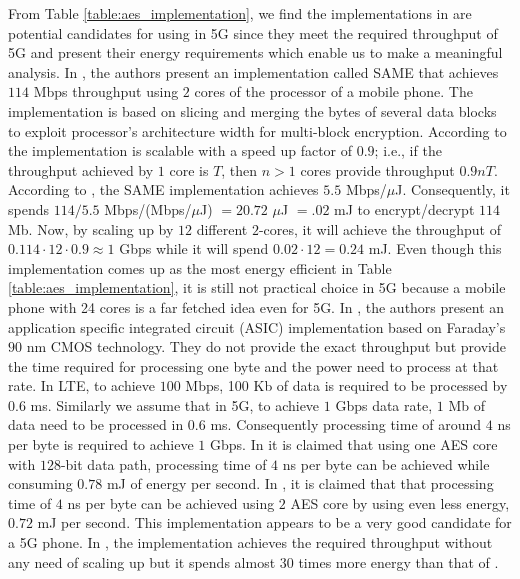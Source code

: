 \documentclass[lnicst,sechang,a4paper]{svmultln}
\begin{document}
From Table \ref{table:aes_implementation}, we find the implementations in \cite{Ruhr_2009, Ruhr_2011, Pune_2012} are potential candidates for using in 5G since they meet the required throughput of 5G and present their energy requirements which enable us to make a meaningful analysis. In \cite{Ruhr_2011}, the authors present an implementation called SAME that achieves $114$ Mbps throughput using $2$ cores of the processor of a mobile phone. The implementation is based on slicing and merging the bytes of several data blocks to exploit processor's architecture width for multi-block encryption. According to \cite[Figure 8]{Ruhr_2011} the implementation is scalable with a speed up factor of $0.9$; i.e., if the throughput achieved by $1$ core is $T$, then $n > 1$ cores provide throughput $0.9nT$. According to \cite[Figure 9]{Ruhr_2011}, the SAME implementation achieves $5.5$ Mbps/$\mu$J. Consequently, it spends $114/5.5$ Mbps/(Mbps/$\mu$J) $=20.72$ $\mu$J $=.02$ mJ to encrypt/decrypt $114$ Mb. Now, by scaling up by $12$ different $2$-cores, it will achieve the throughput of $0.114 \cdot 12 \cdot 0.9 \approx 1$ Gbps while it will spend $0.02\cdot12=0.24$ mJ. Even though this implementation comes up as the most energy efficient in Table \ref{table:aes_implementation}, it is still not practical choice in 5G because a mobile phone with 24 cores is a far fetched idea even for 5G. In \cite{Ruhr_2009}, the authors present an application specific integrated circuit (ASIC) implementation based on Faraday's $90$ nm CMOS technology. They do not provide the exact throughput but provide the time required for processing one byte and the power need to process at that rate. In LTE, to achieve $100$ Mbps, 100 Kb of data is required to be processed by $0.6$ ms. Similarly we assume that in 5G, to achieve $1$ Gbps data rate, $1$ Mb of data need to be processed in $0.6$ ms. Consequently processing time of around $4$ ns per byte is required to achieve $1$ Gbps. In \cite[Figure 8]{Ruhr_2009} it is claimed that using one AES core with $128$-bit data path, processing time of $4$ ns per byte can be achieved while consuming $0.78$ mJ of energy per second. In \cite[Figure 10]{Ruhr_2009}, it is claimed that that processing time of $4$ ns per byte can be achieved using $2$ AES core by using even less energy, $0.72$ mJ per second. This implementation appears to be a very good candidate for a 5G phone.  In \cite{Pune_2012}, the implementation achieves the required throughput without any need of scaling up but it spends almost $30$ times more energy than that of \cite{Ruhr_2009}.
\end{document}

